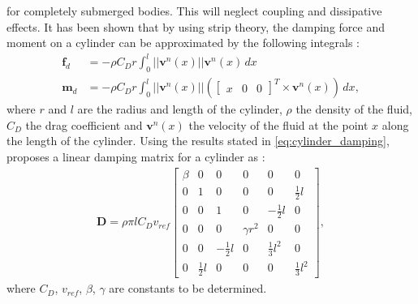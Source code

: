 for completely submerged bodies. This will neglect coupling and dissipative effects.
It has been shown that by using strip theory, the damping force and
moment on a cylinder can be approximated by the following integrals \cite{mcmillan1995}:
\begin{subequations}
    \label{eq:cylinder_damping}
    \begin{align}
        \bm{f}_d &= - \rho C_D r \int_{0}^{l} ||\bm{v}^n(x)|| \bm{v}^n(x) \,dx \\
        \bm{m}_d &= - \rho C_D r \int_{0}^{l} ||\bm{v}^n(x)||
        \left(\begin{bmatrix}x & 0 & 0\end{bmatrix}^T \times \bm{v}^n(x)\right) \,dx,
    \end{align}
\end{subequations}
where $r$ and $l$ are the radius and length of the cylinder, $\rho$ the density
of the fluid, $C_D$ the drag coefficient and $\bm{v}^n(x)$ the velocity of the
fluid at the point $x$ along the length of the cylinder. Using the results stated
in \autoref{eq:cylinder_damping}, \citeauthor{schmidt2018} proposes a linear
damping matrix for a cylinder as \cite{schmidt2018}:
\begin{align}
    \bm{D} = \rho \pi l C_D v_{ref}
    \begin{bmatrix}
        \beta &            0 &             0 &          0 &              0 &            0 \\
            0 &            1 &             0 &          0 &              0 & \frac{1}{2}l \\
            0 &            0 &             1 &          0 &  -\frac{1}{2}l &            0 \\
            0 &            0 &             0 & \gamma r^2 &              0 &            0 \\
            0 &            0 & -\frac{1}{2}l &          0 & \frac{1}{3}l^2 &            0 \\
            0 & \frac{1}{2}l &             0 &          0 &              0 & \frac{1}{3}l^2
    \end{bmatrix},
\label{eq:damping_cyl}
\end{align}
where $C_D$, $v_{ref}$, $\beta$, $\gamma$ are constants to be determined.
